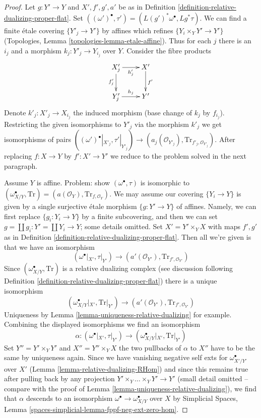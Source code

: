 \documentclass{stacks-project}
\theoremstyle{plain}
\theoremstyle{definition}
\theoremstyle{remark}
\numberwithin{equation}{subsection}
\begin{document}
\begin{proof}
Let $g : Y' \to Y$ and $X', f', g', a'$ be as in
Definition \ref{definition-relative-dualizing-proper-flat}.
Set $((\omega')^\bullet, \tau') = (L(g')^*\omega^\bullet, Lg^*\tau)$.
We can find a finite \'etale covering
$\{Y'_j \to Y'\}$ by affines which refines $\{Y_i \times_Y Y' \to Y'\}$
(Topologies, Lemma \ref{topologies-lemma-etale-affine}).
Thus for each $j$ there is an $i_j$ and a morphism
$k_j : Y'_j \to Y_{i_j}$ over $Y$. Consider the fibre products
$$
\xymatrix{
X'_j \ar[r]_{h_j'} \ar[d]_{f'_j} &
X' \ar[d]^{f'} \\
Y'_j \ar[r]^{h_j} & Y'
}
$$
Denote $k'_j : X'_j \to X_{i_j}$ the induced morphism (base change
of $k_j$ by $f_{i_j}$). Restricting the given isomorphisms to $Y'_j$
via the morphism $k'_j$ we get isomorphisms of pairs
$((\omega')^\bullet|_{X'_j}, \tau'|_{Y'_j})
\to (a_j(\mathcal{O}_{Y'_j}), \text{Tr}_{f'_j, \mathcal{O}_{Y'_j}})$.
After replacing $f : X \to Y$ by $f' : X' \to Y'$ we reduce to the
problem solved in the next paragraph.

\medskip\noindent
Assume $Y$ is affine. Problem: show $(\omega^\bullet, \tau)$ is
isomorphic to $(\omega_{X/Y}^\bullet, \text{Tr}) =
(a(\mathcal{O}_Y), \text{Tr}_{f, \mathcal{O}_Y})$.
We may assume our covering $\{Y_i \to Y\}$ is given by a single
surjective \'etale morphism $\{g : Y' \to Y\}$ of affines.
Namely, we can first replace $\{g_i: Y_i \to Y\}$ by a finite
subcovering, and then we can set $g = \coprod g_i :  Y' = \coprod Y_i \to Y$;
some details omitted. Set $X' = Y' \times_Y X$ with maps
$f', g'$ as in Definition \ref{definition-relative-dualizing-proper-flat}.
Then all we're given is that we have an isomorphism
$$
(\omega^\bullet|_{X'}, \tau|_{Y'}) \to
(a'(\mathcal{O}_{Y'}), \text{Tr}_{f', \mathcal{O}_{Y'}})
$$
Since $(\omega_{X/Y}^\bullet, \text{Tr})$ is a relative dualizing complex
(see discussion following
Definition \ref{definition-relative-dualizing-proper-flat})
there is a unique isomorphism
$$
(\omega_{X/Y}^\bullet|_{X'}, \text{Tr}|_{Y'}) \to
(a'(\mathcal{O}_{Y'}), \text{Tr}_{f', \mathcal{O}_{Y'}})
$$
Uniqueness by Lemma \ref{lemma-uniqueness-relative-dualizing} for example.
Combining the displayed isomorphisms we find an isomorphism
$$
\alpha :
(\omega^\bullet|_{X'}, \tau|_{Y'}) \to
(\omega_{X/Y}^\bullet|_{X'}, \text{Tr}|_{Y'})
$$
Set $Y'' = Y' \times_Y Y'$ and $X'' = Y'' \times_Y X$ the two
pullbacks of $\alpha$ to $X''$ have to be the same by uniqueness again.
Since we have vanishing negative self exts for
$\omega_{X'/Y'}^\bullet$ over $X'$ (Lemma \ref{lemma-relative-dualizing-RHom})
and since this remains true after pulling back by any projection
$Y' \times_Y \ldots \times_Y Y' \to Y'$ (small detail omitted -- compare
with the proof of Lemma \ref{lemma-uniqueness-relative-dualizing}),
we find that $\alpha$ descends to an isomorphism
$\omega^\bullet \to \omega_{X/Y}^\bullet$
over $X$ by Simplicial Spaces, Lemma
\ref{spaces-simplicial-lemma-fppf-neg-ext-zero-hom}.
\end{proof}
\end{document}
